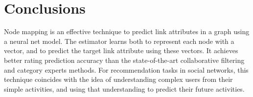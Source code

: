 \documentclass{article}
\begin{document}
\section{Conclusions}
Node mapping is an effective technique to predict link attributes in a graph 
using a neural net model.
The estimator learns both to represent each node with a vector, and to predict 
the target link attribute using these vectors.
It achieves better rating prediction accuracy than the state-of-the-art 
collaborative filtering and category experts methods.
For recommendation tasks in social networks, this technique coincides with the 
idea of understanding complex users from their simple activities, and using 
that understanding to predict their future activities.



\end{document}
